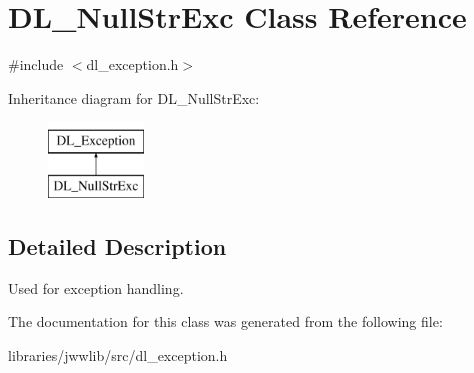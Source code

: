 \hypertarget{classDL__NullStrExc}{\section{D\-L\-\_\-\-Null\-Str\-Exc Class Reference}
\label{classDL__NullStrExc}
}


{\ttfamily \#include $<$dl\-\_\-exception.\-h$>$}

Inheritance diagram for D\-L\-\_\-\-Null\-Str\-Exc\-:\begin{figure}[H]
\begin{center}
\leavevmode
\includegraphics[height=2.000000cm]{classDL__NullStrExc}
\end{center}
\end{figure}


\subsection{Detailed Description}
Used for exception handling. 

The documentation for this class was generated from the following file\-:\begin{DoxyCompactItemize}
\item 
libraries/jwwlib/src/dl\-\_\-exception.\-h\end{DoxyCompactItemize}
